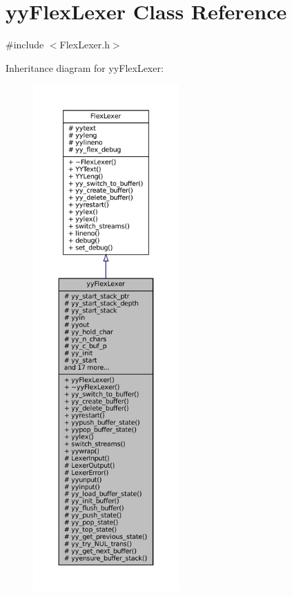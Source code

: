 \hypertarget{classyyFlexLexer}{}\section{yy\+Flex\+Lexer Class Reference}
\label{classyyFlexLexer}


{\ttfamily \#include $<$Flex\+Lexer.\+h$>$}



Inheritance diagram for yy\+Flex\+Lexer\+:
\nopagebreak
\begin{figure}[H]
\begin{center}
\leavevmode
\includegraphics[height=550pt]{classyyFlexLexer__inherit__graph}
\end{center}
\end{figure}


